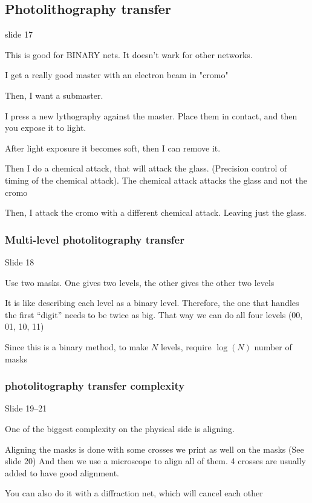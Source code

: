 \documentclass[../main/main.tex]{subfiles}
\begin{document}
\subsection{Photolithography transfer}

slide 17

This is good for BINARY  nets. It doesn't wark for other networks.


I get a really good master with an electron beam in "cromo"

Then, I want a submaster.

I press a new lythography against the master. Place them in contact, and then you expose it to light.

After light exposure it becomes soft, then I can remove it.

Then I do a chemical attack, that will attack the glass. (Precision control of timing of the chemical attack). The chemical attack attacks the glass and not the cromo

Then, I attack the cromo with a different chemical attack. Leaving just the glass.


\subsubsection{Multi-level photolitography transfer}
Slide 18

Use two masks. One gives two levels, the other gives the other two levels

It is like describing each level as a binary level. Therefore, the one that handles the first ``digit'' needs to be twice as big. That way we can do all four levels (00, 01, 10, 11)

Since this is a binary method, to make $N$ levels, require $\log(N)$ number of masks

\subsubsection{photolitography transfer complexity}

Slide 19--21

One of the biggest complexity on the physical side is aligning.

Aligning the masks is done with some crosses we print as well on the masks (See slide 20)
And then we use a microscope to align all of them.
4 crosses are usually added to have good alignment.

You can also do it with a diffraction net, which will cancel each other
\end{document}
